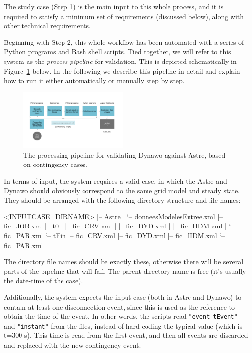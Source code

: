 \documentclass[conference]{IEEEtran}
\newcommand{\code}[1]{\texttt{#1}}
\begin{document}
The study case (Step 1) is the main input to this whole process, and it is
required to satisfy a minimum set of requirements (discussed below), along with
other technical requirements.

Beginning with Step 2, this whole workflow has been automated with a series of
Python programs and Bash shell scripts. Tied together, we will refer to this
system as the \emph{process pipeline} for validation. This is depicted
schematically in Figure~\ref{fig:pipeline1} below.  In the following we describe
this pipeline in detail and explain how to run it either automatically or
manually step by step.

\begin{figure}
  \centering
  \includegraphics[width=0.48\textwidth]{figs/pipeline1}
  \caption{The processing pipeline for validating Dynawo against
    Astre, based on contingency cases.}
  \label{fig:pipeline1}
\end{figure}

In terms of input, the system requires a valid case, in which the Astre and
Dynawo should obviously correspond to the same grid model and steady state.
They should be arranged with the following directory structure and file names:
\begin{console}
  <INPUTCASE_DIRNAME>
  |-- Astre
  |   `-- donneesModelesEntree.xml
  |-- fic_JOB.xml
  |-- t0
  |   |-- fic_CRV.xml
  |   |-- fic_DYD.xml
  |   |-- fic_IIDM.xml
  |   `-- fic_PAR.xml
  `-- tFin
  |-- fic_CRV.xml
  |-- fic_DYD.xml
  |-- fic_IIDM.xml
  `-- fic_PAR.xml
\end{console}

The directory file names should be exactly these, otherwise there will be
several parts of the pipeline that will fail. The parent directory name is free
(it's usually the date-time of the case).

Additionally, the system expects the input case (both in Astre and Dynawo) to
contain at least one disconnection event, since this is used as the reference to
obtain the time of the event. In other words, the scripts read
\code{"event\_tEvent"} and \code{"instant"} from the files, instead of
hard-coding the typical value (which is t=300 s). This time is read from the
first event, and then all events are discarded and replaced with the new
contingency event.
\end{document}
